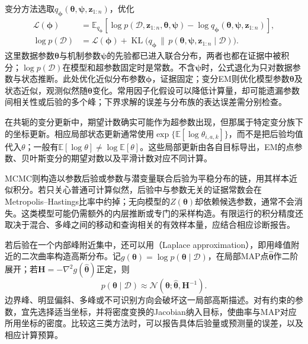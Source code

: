 变分方法选取$q_{\bm{\phi}}(\bm{\theta},\bm{\psi},\bm{z}_{1:n})$，优化
\begin{equation}
  \begin{aligned}
    \mathcal{L}(\bm{\phi})
      &=\mathbb{E}_{q_{\bm{\phi}}}
       [\log p(\mathcal{D},\bm{z}_{1:n},\bm{\theta},\bm{\psi})
        -\log q_{\bm{\phi}}
          (\bm{\theta},\bm{\psi},\bm{z}_{1:n})],\\
    \log p(\mathcal{D})
      &=\mathcal{L}(\bm{\phi})
        +\operatorname{KL}\bigl(
          q_{\bm{\phi}}\,\|\,
          p(\bm{\theta},\bm{\psi},\bm{z}_{1:n}\mid\mathcal{D})
        \bigr).
  \end{aligned}
  \label{eq:pgm-parameter-learning-bayesian-elbo}
\end{equation}
这里数据参数$\bm{\theta}$与机制参数$\bm{\psi}$的先验都已进入联合分布，两者也都在证据中被积分；$\log p(\mathcal{D})$在模型和超参数固定时是常数。不含$\bm{\psi}$时，公式退化为只对数据参数与状态推断。此处优化近似分布参数$\bm{\phi}$，证据固定；变分EM则优化模型参数$\bm{\theta}$及状态近似，观测似然随$\bm{\theta}$变化。常用因子化假设可以降低计算量，却可能遗漏参数间相关性或后验的多个峰；下界求解的误差与分布族的表达误差需分别检查。

在共轭的变分更新中，期望计数确实可能作为超参数出现，但那属于特定变分族下的坐标更新。相应局部状态更新通常使用$\exp\{\mathbb{E}[\log\theta_{i,a,k}]\}$，而不是把后验均值代入$\theta$；一般有$\mathbb{E}[\log\theta]\ne\log\mathbb{E}[\theta]$。这些局部更新由各自目标导出，EM的点参数、贝叶斯变分的期望对数以及平滑计数对应不同计算。

MCMC则构造以参数后验或参数与潜变量联合后验为平稳分布的链，用其样本近似积分。若只关心普通可计算似然，后验中与参数无关的证据常数会在Metropolis--Hastings比率中约掉；无向模型的$Z(\bm{\theta})$却依赖候选参数，通常不会消失。这类模型可能仍需额外的内层推断或专门的采样构造。有限运行的积分精度还取决于混合、多峰之间的移动和查询相关的有效样本量，应结合相应诊断报告。

若后验在一个内部峰附近集中，还可以用（Laplace approximation），即用峰值附近的二次曲率构造高斯分布。记$g(\bm{\theta})=\log p(\bm{\theta}\mid\mathcal{D})$，在局部MAP点$\widehat{\bm{\theta}}$作二阶展开；若$\bm{H}=-\nabla^2g(\widehat{\bm{\theta}})$正定，则
\[
  p(\bm{\theta}\mid\mathcal{D})
    \approx\mathcal{N}(\bm{\theta};
          \widehat{\bm{\theta}},\bm{H}^{-1}).
\]
边界峰、明显偏斜、多峰或不可识别方向会破坏这一局部高斯描述。对有约束的参数，宜先选择适当坐标，并将密度变换的Jacobian纳入目标，使曲率与MAP对应所用坐标的密度。比较这三类方法时，可以报告具体后验量或预测量的误差，以及相应计算预算。

